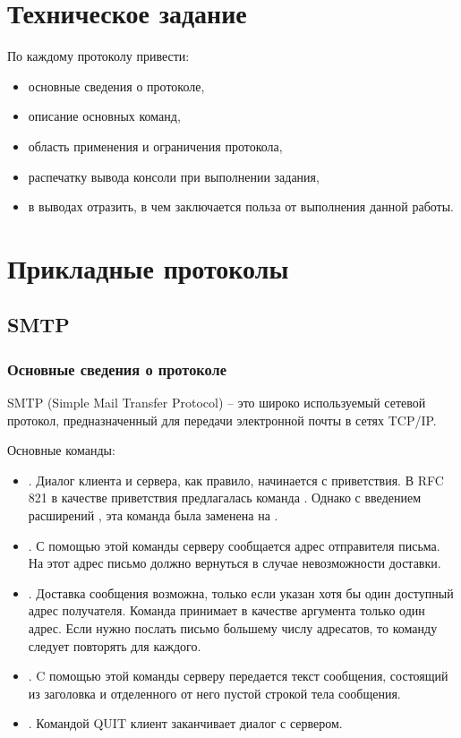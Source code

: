 





\tableofcontents
\newpage

\section{Техническое задание}

По каждому протоколу привести:

\begin{itemize}
	\item основные сведения о протоколе,
	\item описание основных команд,
	\item область применения и ограничения протокола,
	\item распечатку вывода консоли при выполнении задания,
	\item в выводах отразить, в чем заключается польза от выполнения данной работы.
\end{itemize}

\section{Прикладные протоколы}

\subsection{SMTP}

\subsubsection{Основные сведения о протоколе}

SMTP (Simple Mail Transfer Protocol) -- это широко используемый сетевой протокол, предназначенный для передачи электронной почты в сетях TCP/IP.

Основные команды:

\begin{itemize}
	\item {}. Диалог клиента и сервера, как правило, начинается с приветствия. В RFC 821 в качестве приветствия предлагалась команда . Однако с введением расширений , эта команда была заменена на .
	\item {}. С помощью этой команды серверу сообщается адрес отправителя письма. На этот адрес письмо должно вернуться в случае невозможности доставки.
	\item {}. Доставка сообщения возможна, только если указан хотя бы один доступный адрес получателя. Команда  принимает в качестве аргумента только один адрес. Если нужно послать письмо большему числу адресатов, то команду  следует повторять для каждого.
	\item {}. C помощью этой команды серверу передается текст сообщения, состоящий из заголовка и отделенного от него пустой строкой тела сообщения.
	\item {}. Командой QUIT клиент заканчивает диалог с сервером.
\end{itemize}


